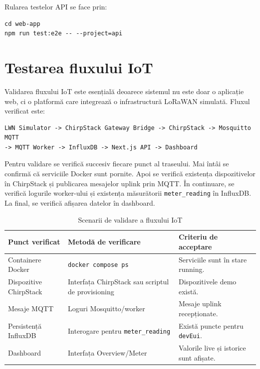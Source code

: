 Rularea testelor API se face prin:

\begin{verbatim}
cd web-app
npm run test:e2e -- --project=api
\end{verbatim}

\section{Testarea fluxului IoT}

Validarea fluxului IoT este esențială deoarece sistemul nu este doar o aplicație web, ci o platformă care integrează o infrastructură LoRaWAN simulată. Fluxul verificat este:

\begin{verbatim}
LWN Simulator -> ChirpStack Gateway Bridge -> ChirpStack -> Mosquitto MQTT
-> MQTT Worker -> InfluxDB -> Next.js API -> Dashboard
\end{verbatim}

Pentru validare se verifică succesiv fiecare punct al traseului. Mai întâi se confirmă că serviciile Docker sunt pornite. Apoi se verifică existența dispozitivelor în ChirpStack și publicarea mesajelor uplink prin MQTT. În continuare, se verifică logurile worker-ului și existența măsurătorii \texttt{meter\_reading} în InfluxDB. La final, se verifică afișarea datelor în dashboard.

\begin{table}[htbp]
\centering
\small
\begin{tabular}{|p{}|p{}|p{}|}
\hline
\textbf{Punct verificat} & \textbf{Metodă de verificare} & \textbf{Criteriu de acceptare} \\
\hline
Containere Docker & \texttt{docker compose ps} & Serviciile sunt în stare running. \\
\hline
Dispozitive ChirpStack & Interfața ChirpStack sau scriptul de provisioning & Dispozitivele demo există. \\
\hline
Mesaje MQTT & Loguri Mosquitto/worker & Mesaje uplink recepționate. \\
\hline
Persistență InfluxDB & Interogare pentru \texttt{meter\_reading} & Există puncte pentru \texttt{devEui}. \\
\hline
Dashboard & Interfața Overview/Meter & Valorile live și istorice sunt afișate. \\
\hline
\end{tabular}
\caption{Scenarii de validare a fluxului IoT}
\label{tab:teste-flux-iot}
\end{table}

